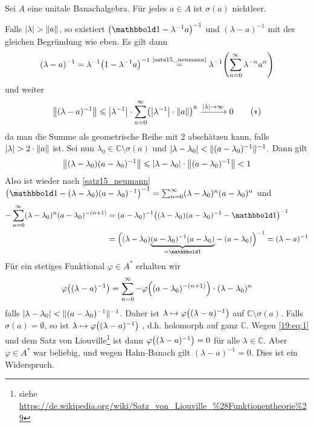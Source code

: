 \begin{satz}[{name=[In unitalen Banachalgebren sind die Spektren nie leer]},label=spec_nichtleer]
	Sei $A$ eine unitale Banachalgebra. Für jedes $a \in A$ ist $\sigma(a)$ nichtleer. 
\end{satz}
\begin{beweis}
	Falls $\abs{\lambda}> \norm{a}$, so existiert $\enbrace*{\ind- \lambda^{-1} a}^{-1}$ und $(\lambda-a)^{-1}$ mit der gleichen Begründung wie eben. Es gilt dann
	\begin{align}
		(\lambda-a)^{-1} = \lambda^{-1} \enbrace*{1- \lambda^{-1} a}^{-1} \stackrel{\mbox{\scriptsize\ref{satz15_neumann}}}{=} \lambda^{-1} \enbrace*{\sum_{n=0}^{\infty} 
		\lambda^{-n}a^n}
	\end{align}
	und weiter
	\[
		\norm{(\lambda-a)^{-1}} \le \abs*{\lambda^{-1}} \cdot \sum_{n=0}^{\infty} \enbrace*{\abs*{\lambda^{-1}} \cdot \norm{a}}^n  \xrightarrow{\abs{\lambda} \to \infty} 0 
		\label{19:eq:1} \tag{$*$}
	\]
	da man die Summe als geometrische Reihe mit $2$ abschätzen kann, falls $\abs{\lambda}> 2 \cdot \norm{a}$ ist.
	Sei nun $\lambda_0 \in \mathbb{C}\setminus \sigma(a)$ und $\lvert\lambda-\lambda_0\rvert< \Vert(a- \lambda_0)^{-1}\Vert^{-1}$. Dann gilt 
	\[
		\norm{(\lambda-\lambda_0)(a - \lambda_0)^{-1}} \le \abs{\lambda-\lambda_0} \cdot \norm{(a-\lambda_0)^{-1}} <1   
	\]
	Also ist wieder nach \autoref{satz15_neumann} $\enbrace*{\ind- (\lambda-\lambda_0)(a-\lambda_0)^{-1}}^{-1} = \sum_{n=0}^{\infty} (\lambda-\lambda_0)^n (a-\lambda_0)^n$ und 
	\begin{align}
		-\sum_{n=0}^{\infty} (\lambda-\lambda_0)^n(a-\lambda_0)^{-(n+1)} &= (a- \lambda_0)^{-1} \enbrace*{(\lambda-\lambda_0)(a-\lambda_0)^{-1}-\ind}^{-1} \\
		&= \enbrace[\Big]{(\lambda-\lambda_0) \Underbrace{(a-\lambda_0)^{-1}(a-\lambda_0)}{=\ind}-(a- \lambda_0)}^{-1} = (\lambda-a)^{-1}
	\end{align}
	Für ein stetiges Funktional $\varphi \in A^*$ erhalten wir 
	\[
		\varphi\enbrace*{(\lambda-a)^{-1}} = \sum_{n=0}^{\infty} - \varphi \enbrace*{(a-\lambda_0)^{-(n+1)}} \cdot (\lambda-\lambda_0)^n
	\]
	falls $\lvert\lambda-\lambda_0\rvert < \Vert(a- \lambda_0)^{-1}\Vert^{-1}$. Daher ist $\lambda \mapsto \varphi \enbrace*{(\lambda-a)^{-1}}$  auf 
	$\mathbb{C}\setminus \sigma(a)$. Falls $\sigma(a)= \emptyset$, so ist $\lambda \mapsto \varphi \enbrace*{(\lambda-a)^{-1}}$ , d.h. holomorph 
	auf ganz $\mathbb{C}$. Wegen \eqref{19:eq:1} und dem Satz von Liouville\footnote{siehe \url{https://de.wikipedia.org/wiki/Satz_von_Liouville_\%28Funktionentheorie\%29}} ist 
	dann $\varphi \enbrace*{(\lambda-a)^{-1}}=0$ für alle $\lambda\in \mathbb{C}$. Aber $\varphi \in A^*$ war beliebig, und wegen Hahn-Banach gilt $(\lambda-a)^{-1}=0$. Dies 
	ist ein Widerspruch. 
\end{beweis}

